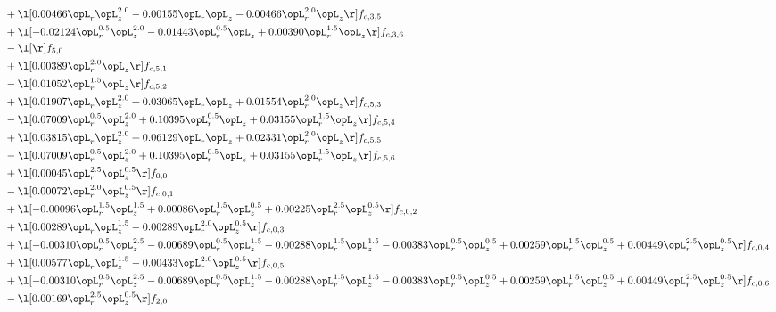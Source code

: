\begin{alignat}{2}
& + \l[  0.00466 \opL_r \opL_z^{2.0}   -0.00155 \opL_r \opL_z   -0.00466 \opL_r^{2.0} \opL_z  \r] f_{c,3,5} \nonumber \\ 
& + \l[  -0.02124 \opL_r^{0.5} \opL_z^{2.0}   -0.01443 \opL_r^{0.5} \opL_z +  0.00390 \opL_r^{1.5} \opL_z  \r] f_{c,3,6} \nonumber \\ 
& - \l[  \r] f_{5,0} \nonumber \\ 
& + \l[  0.00389 \opL_r^{2.0} \opL_z  \r] f_{c,5,1} \nonumber \\ 
& - \l[  0.01052 \opL_r^{1.5} \opL_z  \r] f_{c,5,2} \nonumber \\ 
& + \l[  0.01907 \opL_r \opL_z^{2.0} +  0.03065 \opL_r \opL_z +  0.01554 \opL_r^{2.0} \opL_z  \r] f_{c,5,3} \nonumber \\ 
& - \l[  0.07009 \opL_r^{0.5} \opL_z^{2.0} +  0.10395 \opL_r^{0.5} \opL_z +  0.03155 \opL_r^{1.5} \opL_z  \r] f_{c,5,4} \nonumber \\ 
& + \l[  0.03815 \opL_r \opL_z^{2.0} +  0.06129 \opL_r \opL_z +  0.02331 \opL_r^{2.0} \opL_z  \r] f_{c,5,5} \nonumber \\ 
& - \l[  0.07009 \opL_r^{0.5} \opL_z^{2.0} +  0.10395 \opL_r^{0.5} \opL_z +  0.03155 \opL_r^{1.5} \opL_z  \r] f_{c,5,6} \nonumber \\ 
& + \l[  0.00045 \opL_r^{2.5} \opL_z^{0.5}  \r] f_{0,0} \nonumber \\ 
& - \l[  0.00072 \opL_r^{2.0} \opL_z^{0.5}  \r] f_{c,0,1} \nonumber \\ 
& + \l[  -0.00096 \opL_r^{1.5} \opL_z^{1.5} +  0.00086 \opL_r^{1.5} \opL_z^{0.5} +  0.00225 \opL_r^{2.5} \opL_z^{0.5}  \r] f_{c,0,2} \nonumber \\ 
& + \l[  0.00289 \opL_r \opL_z^{1.5}   -0.00289 \opL_r^{2.0} \opL_z^{0.5}  \r] f_{c,0,3} \nonumber \\ 
& + \l[  -0.00310 \opL_r^{0.5} \opL_z^{2.5}   -0.00689 \opL_r^{0.5} \opL_z^{1.5}   -0.00288 \opL_r^{1.5} \opL_z^{1.5}   -0.00383 \opL_r^{0.5} \opL_z^{0.5} +  0.00259 \opL_r^{1.5} \opL_z^{0.5} +  0.00449 \opL_r^{2.5} \opL_z^{0.5}  \r] f_{c,0,4} \nonumber \\ 
& + \l[  0.00577 \opL_r \opL_z^{1.5}   -0.00433 \opL_r^{2.0} \opL_z^{0.5}  \r] f_{c,0,5} \nonumber \\ 
& + \l[  -0.00310 \opL_r^{0.5} \opL_z^{2.5}   -0.00689 \opL_r^{0.5} \opL_z^{1.5}   -0.00288 \opL_r^{1.5} \opL_z^{1.5}   -0.00383 \opL_r^{0.5} \opL_z^{0.5} +  0.00259 \opL_r^{1.5} \opL_z^{0.5} +  0.00449 \opL_r^{2.5} \opL_z^{0.5}  \r] f_{c,0,6} \nonumber \\ 
& - \l[  0.00169 \opL_r^{2.5} \opL_z^{0.5}  \r] f_{2,0} \nonumber \\ 

\end{alignat}
